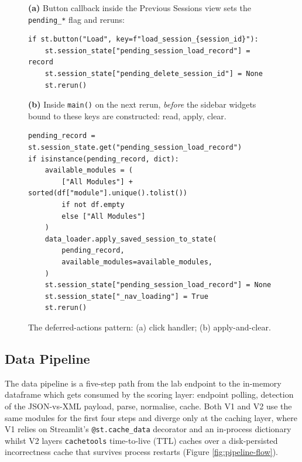 \begin{figure}[H]
    \centering
    \begin{minipage}{0.92\linewidth}
        \textbf{(a)} Button callback inside the Previous Sessions view sets the \texttt{pending\_*} flag and reruns:
\begin{lstlisting}[firstnumber=927]
if st.button("Load", key=f"load_session_{session_id}"):
    st.session_state["pending_session_load_record"] = record
    st.session_state["pending_delete_session_id"] = None
    st.rerun()
\end{lstlisting}

        \textbf{(b)} Inside \texttt{main()} on the next rerun, \emph{before} the sidebar widgets bound to these keys are constructed: read, apply, clear.
\begin{lstlisting}[firstnumber=763]
pending_record = st.session_state.get("pending_session_load_record")
if isinstance(pending_record, dict):
    available_modules = (
        ["All Modules"] + sorted(df["module"].unique().tolist())
        if not df.empty
        else ["All Modules"]
    )
    data_loader.apply_saved_session_to_state(
        pending_record,
        available_modules=available_modules,
    )
    st.session_state["pending_session_load_record"] = None
    st.session_state["_nav_loading"] = True
    st.rerun()
\end{lstlisting}
    \end{minipage}
    \caption{The deferred-actions pattern: (a) click handler; (b) apply-and-clear.}
    \label{fig:code-deferred}
\end{figure}

\subsection{Data Pipeline} \label{sec:pipeline}


The data pipeline is a five-step path from the lab endpoint to the in-memory dataframe which gets consumed by the scoring layer: endpoint polling, detection of the JSON-vs-XML payload, parse, normalise, cache.
Both V1 and V2 use the same modules for the first four steps and diverge only at the caching layer, where V1 relies on Streamlit's \texttt{@st.cache\_data} decorator and an in-process dictionary whilst V2 layers \texttt{cachetools} time-to-live (TTL) caches over a disk-persisted incorrectness cache that survives process restarts (Figure \ref{fig:pipeline-flow}).

